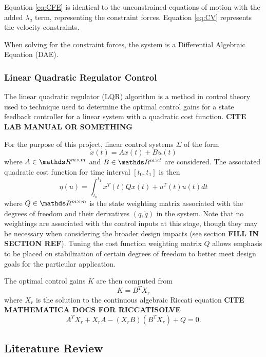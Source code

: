 Equation \ref{eq:CFE} is identical to the unconstrained equations of motion with the added $\lambda_{a}$ term, representing the constraint forces.
Equation \ref{eq:CV} represents the velocity constraints. 
\par
When solving for the constraint forces, the system is a Differential Algebraic Equation (DAE).

\subsubsection{Linear Quadratic Regulator Control}
The linear quadratic regulator (LQR) algorithm is a method in control theory used to technique used to determine the optimal control gains for a state feedback controller for a linear system with a quadratic cost function. \textbf{CITE LAB MANUAL OR SOMETHING}

For the purpose of this project, linear control systems $\Sigma$ of the form
\begin{equation}
\dot{x}(t) = Ax(t) + Bu(t)
\end{equation}
where $A \in \R^{m \times m}$ and $B \in \R^{m \times l}$ are considered.
The associated quadratic cost function for time interval $[t_{0},t_{1}]$ is then 
\begin{equation}
\eta(u) = \int_{t_{0}}^{t_{1}}x^{T}(t)Qx(t)+u^{T}(t)u(t)dt
\end{equation}
where $Q \in \R^{m \times m}$ is the state weighting matrix associated with the degrees of freedom and their derivatives $(q, \dot{q})$ in the system. Note that no weightings are associated with the control inputs at this stage, though they may be necessary when considering the broader design impacts (see section \textbf{FILL IN SECTION REF}). Tuning the cost function weighting matrix $Q$ allows emphasis to be placed on stabilization of certain degrees of freedom to better meet design goals for the particular application.

The optimal control gains $K$ are then computed from
\begin{equation}
K = B^{T}X_{r}
\end{equation}
where  $X_{r}$ is the solution to the continuous algebraic Riccati equation \textbf{CITE MATHEMATICA DOCS FOR RICCATISOLVE}
\begin{equation}
A^{T}X_{r} + X_{r}A - (X_{r}B)(B^{T}X_{r}) + Q = 0.
\end{equation}

\subsection{Literature Review}
